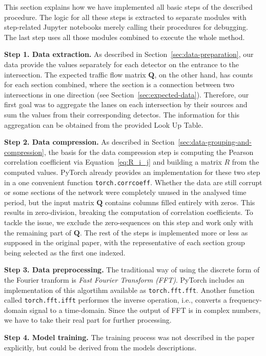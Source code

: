 This section explains how we have implemented all basic steps of the described
procedure. The logic for all these steps is extracted to separate modules with
step-related Jupyter notebooks merely calling their procedures for debugging.
The last step uses all those modules combined to execute the whole method.

\textbf{Step 1. Data extraction.} As described in Section~\ref{sec:data-preparation}, our data provide the values
separately for each detector on the entrance to the intersection. The expected 
traffic flow matrix $\mathbf{Q}$, on the other hand, has counts for each section
combined, where the section is a connection between two intersections in one
direction (see Section~\ref{sec:expected-data}). Therefore, our first goal was
to aggregate the lanes on each intersection by their sources and sum the values
from their corresponding detectos. The information for this aggregation can be
obtained from the provided Look Up Table.

\textbf{Step 2. Data compression.} As described in
Section~\ref{sec:data-grouping-and-compression}, the basis for the data
compression step is computing the Pearson correlation coefficient via 
Equation~\ref{eq:R_i_j} and building a matrix $R$ from the computed values.
PyTorch already provides an implementation for these two step in a one 
convenient function \texttt{torch.corrcoeff}. Whether the data are still corrupt
or some sections of the network were completely unused in the analysed time
period, but the input matrix $\mathbf{Q}$ contains columns filled entirely with
zeros. This results in zero-division, breaking the computation of correlation
coefficients. To tackle the issue, we exclude the zero-sequences on this step
and work only with the remaining part of $\mathbf{Q}$. The rest of the steps is
implemented more or less as supposed in the original paper, with the
representative of each section group being selected as the first one indexed.

\textbf{Step 3. Data preprocessing.} The traditional way of using the discrete
form of the Fourier tranform is \textit{Fast Fourier Transform (FFT)}. PyTorch
includes an implementation of this algortihm available as
\texttt{torch.fft.fft}. Another function called \texttt{torch.fft.ifft}
performes the inverse operation, i.e., converts a frequency-domain signal to a
time-domain. Since the output of FFT is in complex numbers, we have to take
their real part for further processing.

\textbf{Step 4. Model training.} The training process was not described in the
paper explicitly, but could be derived from the models descriptions.

